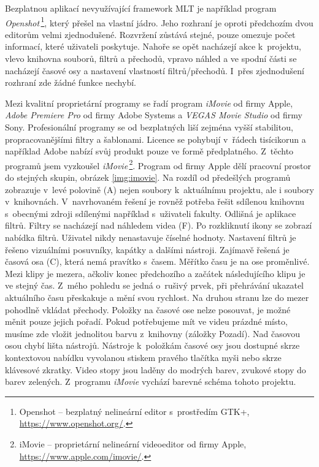 Bezplatnou aplikací nevyužívající framework MLT je například program \textit{Openshot}\,\footnote{Openshot -- bezplatný nelineární editor s~prostředím GTK+, \url{https://www.openshot.org/}.}, který přešel na vlastní jádro. Jeho rozhraní je oproti předchozím dvou editorům velmi zjednodušené. Rozvržení zůstává stejné, pouze omezuje počet informací, které uživateli poskytuje. Nahoře se opět nacházejí akce k~projektu, vlevo knihovna souborů, filtrů a přechodů, vpravo náhled a ve spodní části se nacházejí časové osy a nastavení vlastností filtrů/přechodů. I~přes zjednodušení rozhraní zde žádné funkce nechybí.

Mezi kvalitní proprietární programy se řadí program \textit{iMovie} od firmy Apple, \textit{Adobe Premiere Pro} od firmy Adobe Systems a \textit{VEGAS Movie Studio} od firmy Sony. Profesionální programy se od bezplatných liší zejména vyšší stabilitou, propracovanějšími filtry a šablonami. Licence se pohybují v~řádech tisícikorun a například Adobe nabízí svůj produkt pouze ve formě předplatného. Z~těchto programů jsem vyzkoušel \textit{iMovie}\,\footnote{iMovie -- proprietární nelineární videoeditor od firmy Apple, \url{https://www.apple.com/imovie/}.}. Program od firmy Apple dělí pracovní prostor do stejných skupin, obrázek \ref{img:imovie}. Na rozdíl od předešlých programů zobrazuje v~levé polovině (A) nejen soubory k~aktuálnímu projektu, ale i soubory v~knihovnách. V~navrhovaném řešení je rovněž potřeba řešit sdílenou knihovnu s~obecnými zdroji sdílenými například s~uživateli fakulty. Odlišná je aplikace filtrů. Filtry se nacházejí nad náhledem videa (F). Po rozkliknutí ikony se zobrazí nabídka filtrů. Uživatel nikdy nenastavuje číselné hodnoty. Nastavení filtrů je řešeno vizuálními posuvníky, kapátky a dalšími nástroji. Zajímavě řešená je časová osa (C), která nemá pravítko s~časem. Měřítko času je na ose proměnlivé. Mezi klipy je mezera, ačkoliv konec předchozího a začátek následujícího klipu je ve stejný čas. Z~mého pohledu se jedná o~rušivý prvek, při přehrávání ukazatel aktuálního času přeskakuje a mění svou rychlost. Na druhou stranu lze do mezer pohodlně vkládat přechody. Položky na časové ose nelze posouvat, je možné měnit pouze jejich pořadí. Pokud potřebujeme mít ve videu prázdné místo, musíme zde vložit jednolitou barvu z~knihovny (záložky Pozadí). Nad časovou osou chybí lišta nástrojů. Nástroje k~položkám časové osy jsou dostupné skrze kontextovou nabídku vyvolanou stiskem pravého tlačítka myši nebo skrze klávesové zkratky. Video stopy jsou laděny do modrých barev, zvukové stopy do barev zelených. Z~programu \textit{iMovie} vychází barevné schéma tohoto projektu.

